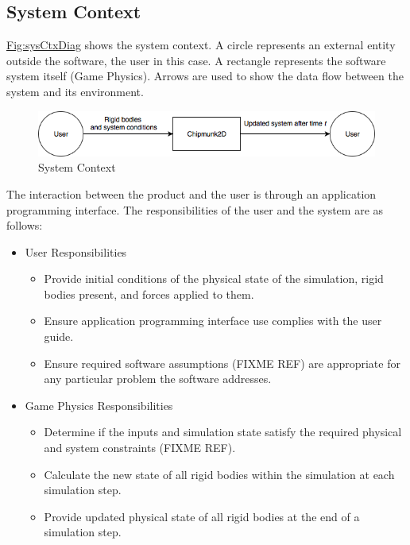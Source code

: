 \documentclass[12pt]{article}
\begin{document}
\subsection{System Context}
\label{Sec:SysContext}
\hyperref[Figure:sysCtxDiag]{Fig:sysCtxDiag} shows the system context. A circle represents an external entity outside the software, the user in this case. A rectangle represents the software system itself (Game Physics). Arrows are used to show the data flow between the system and its environment.
\begin{figure}
\begin{center}
\includegraphics[width=\textwidth]{../../../datafiles/GamePhysics/sysctx.png}
\caption{System Context}
\label{Figure:sysCtxDiag}
\end{center}
\end{figure}
The interaction between the product and the user is through an application programming interface. The responsibilities of the user and the system are as follows:
\begin{itemize}
\item{User Responsibilities}
\begin{itemize}
\item{Provide initial conditions of the physical state of the simulation, rigid bodies present, and forces applied to them.}
\item{Ensure application programming interface use complies with the user guide.}
\item{Ensure required software assumptions (FIXME REF) are appropriate for any particular problem the software addresses.}
\end{itemize}
\item{Game Physics Responsibilities}
\begin{itemize}
\item{Determine if the inputs and simulation state satisfy the required physical and system constraints (FIXME REF).}
\item{Calculate the new state of all rigid bodies within the simulation at each simulation step.}
\item{Provide updated physical state of all rigid bodies at the end of a simulation step.}
\end{itemize}
\end{itemize}
\end{document}

